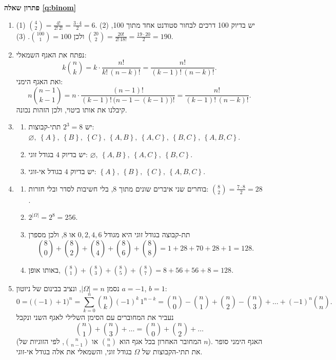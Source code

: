 \documentclass[11pt,a4paper]{report}
\newcommand{\set}[1]{\left\{#1\right\}}
\renewcommand{\emptyset}{\varnothing}
\newenvironment{solution}[1]{\par\bigskip\noindent
  {\sffamily\bfseries\color{thmc}פתרון שאלה \ref{q:#1}}\par\nopagebreak\smallskip}%
  {\par\medskip\noindent{\color{exc!50}\rule{\linewidth}{0.4pt}}\par}
\newcommand{\ans}[1]{\boxed{#1}}
\begin{document}
\begin{solution}{binom}
\begin{enumerate}[label=(\alph*)]
  \item (1) $\binom42=\frac{4!}{2!\,2!}=\frac{3\cdot4}{2}=\ans6$. \quad
  (2) יש בדיוק 100 דרכים לבחור סטודנט אחד מתוך 100, ולכן $\binom{100}1=\ans{100}$. \quad
  (3) $\binom{20}2=\frac{20!}{2!\,18!}=\frac{19\cdot20}2=\ans{190}$.
  \item נפתח את האגף השמאלי:
  \[
    k\binom nk=k\cdot\frac{n!}{k!\,(n-k)!}=\frac{n!}{(k-1)!\,(n-k)!}.
  \]
  ואת האגף הימני:
  \[
    n\binom{n-1}{k-1}=n\cdot\frac{(n-1)!}{(k-1)!\,\big(n-1-(k-1)\big)!}=\frac{n!}{(k-1)!\,(n-k)!}.
  \]
  קיבלנו את אותו ביטוי, ולכן הזהות נכונה.
  \item
  \begin{enumerate}[label=(\arabic*)]
    \item יש $2^3=\ans8$ תתי-קבוצות: $\emptyset,\ \set A,\ \set B,\ \set C,\ \set{A,B},\ \set{A,C},\ \set{B,C},\ \set{A,B,C}$.
    \item יש בדיוק $\ans4$ בגודל זוגי: $\emptyset,\ \set{A,B},\ \set{A,C},\ \set{B,C}$.
    \item יש בדיוק $\ans4$ בגודל אי-זוגי: $\set A,\ \set B,\ \set C,\ \set{A,B,C}$.
  \end{enumerate}
  \item
  \begin{enumerate}[label=(\arabic*)]
    \item בוחרים שני איברים שונים מתוך 8, בלי חשיבות לסדר ובלי חזרות: $\binom82=\frac{7\cdot8}2=\ans{28}$.
    \item $2^{|\Omega|}=2^8=\ans{256}$.
    \item תת-קבוצה בגודל זוגי היא מגודל $0,2,4,6$ או $8$, ולכן מספרן
    \[
      \binom80+\binom82+\binom84+\binom86+\binom88=1+28+70+28+1=\ans{128}.
    \]
    \item באותו אופן, $\binom81+\binom83+\binom85+\binom87=8+56+56+8=\ans{128}$.
  \end{enumerate}
  \item נסמן $|\Omega|=n$, ונציב בבינום של ניוטון $a=-1$, $b=1$:
  \[
    0=\big((-1)+1\big)^n=\sum_{k=0}^n\binom nk(-1)^k\,1^{n-k}=\binom n0-\binom n1+\binom n2-\binom n3+\dots+(-1)^n\binom nn.
  \]
  נעביר את המחוברים עם הסימן השלילי לאגף השני ונקבל
  \[
    \ans{\binom n1+\binom n3+\dots=\binom n0+\binom n2+\dots}
  \]
  (המחובר האחרון בכל אגף הוא $\binom nn$ או $\binom n{n-1}$, לפי הזוגיות של $n$). האגף הימני סופר את תתי-הקבוצות של $\Omega$ בגודל זוגי, והשמאלי את אלה בגודל אי-זוגי.
\end{enumerate}
\end{solution}
\end{document}
